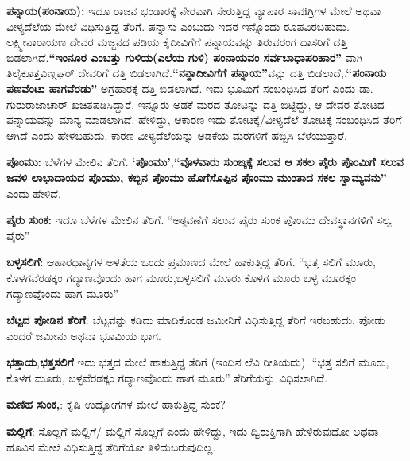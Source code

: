 \textbf{ಪನ್ನಾಯ(ಪಂನಾಯ):} ಇದೂ ರಾಜನ ಭಂಡಾರಕ್ಕೆ ನೇರವಾಗಿ ಸೇರುತ್ತಿದ್ದ ವ್ಯಾಪಾರ ಸಾವiಗ್ರಿಗಳ ಮೇಲೆ ಅಥವಾ ವೀಳ್ಯದೆಲೆಯ ಮೇಲೆ ವಿಧಿಸುತ್ತಿದ್ದ ತೆರಿಗೆ. ಪನ್ನಾಸು ಎಂಬುದು ಇದರ ಇನ್ನೊಂದು ರೂಪವಿರಬಹುದು. ಲಕ್ಷ್ಮೀನಾರಾಯಣ ದೇವರ ಮಜ್ಜನದ ಪಡಿಯ ಕೈದೀವಿಗೆಗೆ ಪನ್ನಾಯವನ್ನು ತಿರುವರಂಗ ದಾಸರಿಗೆ ದತ್ತಿ ಬಿಡಲಾಗಿದೆ.\textbf{“ಇಂನೂರ ಎಂಬತ್ತು ಗುಳಿಯ(ಎಲೆಯ ಗುಳಿ) ಪಂನಾಯವಂ ಸರ್ವಬಾಧಾಪರಿಹಾರ”} ವಾಗಿ ತಿಲೈಕೂತ್ತವಿಣ್ನಘರ್​ ದೇವರಿಗೆ ದತ್ತಿ ಬಿಡಲಾಗಿದೆ.\break \textbf{“ನನ್ದಾದೀವಿಗೆಗೆ ಪನ್ನಾಯ”}ವನ್ನು ದತ್ತಿ ಬಿಡಲಾದೆ,\textbf{.“ಪಂನಾಯ ಪಣವೆಂಟು ಹಾಗವೆರಡು”} ಅಗ್ರಹಾರಕ್ಕೆ ದತ್ತಿ ಬಿಡಲಾಗಿದೆ. ಇದು ಭೂಮಿಗೆ ಸಂಬಂಧಿಸಿದ ತೆರಿಗೆ ಎಂದು ಡಾ. ಗುರುರಾಜಾಚಾರ್​ ಖಚಿತಪಡಿಸಿದ್ದಾರೆ. ಇನ್ನೂರು ಅಡಕೆ ಮರದ ತೋಟನ್ನು ದತ್ತಿ ಬಿಟ್ಟಿದ್ದು, ಆ ದೇವರ ತೋಟದ ಪನ್ನಾಯವನ್ನು ಮಾನ್ಯ ಮಾಡಲಾಗಿದೆ. ಹೇಳಿದ್ದು, ಆಕಾರಣ ಇದು ತೋಟಕ್ಕೆ/ವೀಳ್ಯದೆಲೆ ತೋಟಕ್ಕೆ ಸಂಬಂಧಿಸಿದ ತೆರಿಗೆ ಆಗಿದೆ ಎಂದು ಹೇಳಬಹುದು. ಕಾರಣ ವೀಳ್ಯದೆಲೆಯನ್ನು ಅಡಕೆಯ ಮರಗಳಿಗೆ ಹಬ್ಬಿಸಿ ಬೆಳೆಯುತ್ತಾರೆ.

\textbf{ಪೊಂಮು:} ಬೆಳೆಗಳ ಮೇಲಿನ ತೆರಿಗೆ.\textbf{ ‘ಪೊಂಮು’},\textbf{“ವೊಳವಾರು ಸುಂಙ್ಕಕ್ಕೆ ಸಲುವ ಆ ಸಕಲ ಪೈರು ಪೊಂಮಿಗೆ ಸಲುವ ಜವಳಿ ಲಾಭಾದಾಯದ ಪೊಂಮು, ಕಬ್ಬಿನ ಪೊಂಮು ಹೊಗೆಸೊಪ್ಪಿನ ಪೊಂಮು ಮುಂತಾದ ಸಕಲ ಸ್ವಾಮ್ಯವನು”} ಎಂದು ಹೇಳಿದೆ.

\textbf{ಪೈರು ಸುಂಕ: } ಇದೂ ಬೆಳೆಗಳ ಮೇಲಿನ ತೆರಿಗೆ. “ಅಠ್ಠವಣೆಗೆ ಸಲುವ ಪೈರು ಸುಂಕ ಪೊಂಮು ದೇವಸ್ಥಾನಗಳಿಗೆ ಸಲ್ವ ಪೈರು”

\textbf{ಬಳ್ಳಸಲಿಗೆ}: ಆಹಾರಧಾನ್ಯಗಳ ಅಳತೆಯ ಒಂದು ಪ್ರಮಾಣದ ಮೇಲೆ ಹಾಕುತ್ತಿದ್ದ ತೆರಿಗೆ. “ಭತ್ತ ಸಲಿಗೆ ಮೂರು, ಕೊಳಗವೆರಡಕ್ಕಂ ಗದ್ಯಾಣವೊಂದು ಹಾಗ ಮೂರು,ಬಳ್ಳಸಲಿಗೆ ಮೂರು ಕೊಳಗ ಮೂರು ಬಳ್ಳ ಮೂರಕ್ಕಂ ಗದ್ಯಾಣವೊಂದು ಹಾಗ ಮೂರು”

\textbf{ಬೆಟ್ಟದ ಪೋಡಿನ ತೆರಿಗೆ}: ಬೆಟ್ಟವನ್ನು ಕಡಿದು ಮಾಡಿಕೊಂಡ ಜಮೀನಿಗೆ ವಿಧಿಸುತ್ತಿದ್ದ ತೆರಿಗೆ ಇರಬಹುದು. ಪೋಡು ಎಂದರೆ ಜಮೀನು ಅಥವಾ ಭೂಮಿಯ ಭಾಗ.

\textbf{ಭತ್ತಾಯ},\textbf{ಭತ್ತಸಲಿಗೆ} ಇದು ಭತ್ತದ ಮೇಲೆ ಹಾಕುತ್ತಿದ್ದ ತೆರಿಗೆ (ಇಂದಿನ ಲೆವಿ ರೀತಿಯದು). “ಭತ್ತ ಸಲಿಗೆ ಮೂರು, ಕೊಳಗ ಮೂರು, ಬಳ್ಳವೆರಡಕ್ಕಂ ಗದ್ಯಾಣವೊಂದು ಹಾಗ ಮೂರು” ತೆರಿಗೆಯನ್ನು ವಿಧಿಸಲಾಗಿದೆ.

\textbf{ಮಣಿಹ ಸುಂಕ,}: ಕೃಷಿ ಉದ್ಯೋಗಗಳ ಮೇಲೆ ಹಾಕುತ್ತಿದ್ದ ಸುಂಕ?

\textbf{ಮಲ್ಲಿಗೆ}: ಸೊಲ್ಲಗೆ ಮಲ್ಲಿಗೆ/ ಮಲ್ಲಿಗೆ ಸೊಲ್ಲಗೆ ಎಂದು ಹೇಳಿದ್ದು, ಇದು ದ್ವಿರುಕ್ತಿಗಾಗಿ ಹೇಳಿರುವುದೋ ಅಥವಾ ಹೂವಿನ ಮೇಲೆ ವಿಧಿಸುತ್ತಿದ್ದ ತೆರಿಗೆಯೋ ತಿಳಿದುಬರುವುದಿಲ್ಲ.

